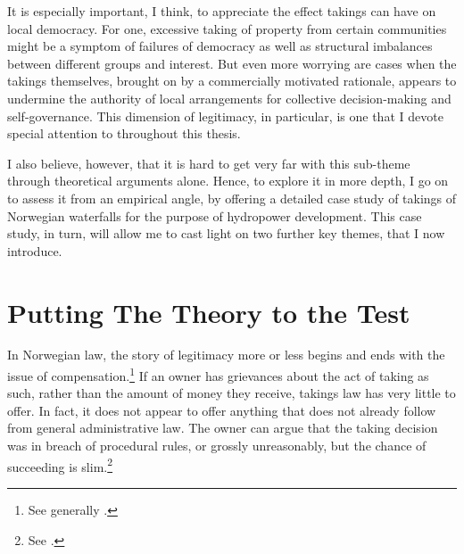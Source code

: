 {It is especially important, I think, to appreciate the effect takings can have on local democracy. For one, excessive taking of property from certain communities might be a symptom of failures of democracy as well as structural imbalances between different groups and interest. But even more worrying are cases when the takings themselves, brought on by a commercially motivated rationale, appears to undermine the authority of local arrangements for collective decision-making and self-governance. This dimension of legitimacy, in particular, is one that I devote special attention to throughout this thesis.

I also believe, however, that it is hard to get very far with this sub-theme through theoretical arguments alone. Hence, to explore it in more depth, I go on to assess it from an empirical angle, by offering a detailed case study of takings of Norwegian waterfalls for the purpose of hydropower development. This case study, in turn, will allow me to cast light on two further key themes, that I now introduce. %
}

\section{Putting The Theory to the Test}\label{sec:1:3}

In Norwegian law, the story of legitimacy more or less begins and ends with the issue of compensation.\footnote{See generally \cite{dyrkolbotn15a}.} If an owner has grievances about the act of taking as such, rather than the amount of money they receive, takings law has very little to offer. In fact, it does not appear to offer anything that does not already follow from general administrative law. The owner can argue that the taking decision was in breach of procedural rules, or grossly unreasonably, but the chance of succeeding is slim.\footnote{See \cite[384-386]{dyrkolbotn15b}.}


